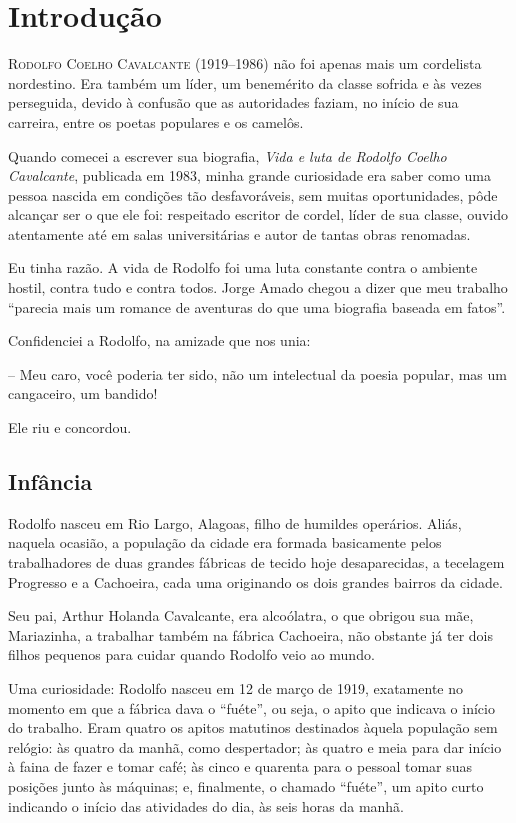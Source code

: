 \chapter[Introdução, por Eno T. Wanke]{Introdução}

\textsc{Rodolfo Coelho Cavalcante} (1919--1986) não foi apenas mais um
cordelista nordestino. Era também um líder, um benemérito da classe
sofrida e às vezes perseguida, devido à confusão que as autoridades
faziam, no início de sua carreira, entre os poetas populares e os
camelôs. 

 Quando comecei a escrever sua biografia, \textit{Vida e luta de Rodolfo
Coelho Cavalcante}, publicada em 1983, minha grande curiosidade era
saber como uma pessoa nascida em condições tão desfavoráveis, sem
muitas oportunidades, pôde alcançar ser o que ele foi: respeitado
escritor de cordel, líder de sua classe, ouvido atentamente até em
salas universitárias e autor de tantas obras renomadas. 

 Eu tinha razão. A vida de Rodolfo foi uma luta constante contra o
ambiente hostil, contra tudo e contra todos. Jorge Amado chegou a dizer
que meu trabalho ``parecia mais um romance de aventuras do
que uma biografia baseada em fatos''. 

 Confidenciei a Rodolfo, na amizade que nos unia: 

 -- Meu caro, você poderia ter sido, não um intelectual da poesia
popular, mas um cangaceiro, um bandido! 

 Ele riu e concordou. 

\section{Infância}

 Rodolfo nasceu em Rio Largo, Alagoas, filho de humildes operários.
Aliás, naquela ocasião, a população da cidade era formada basicamente
pelos trabalhadores de duas grandes fábricas de tecido hoje
desaparecidas, a tecelagem Progresso e a Cachoeira, cada uma originando
os dois grandes bairros da cidade. 

 Seu pai, Arthur Holanda Cavalcante, era alcoólatra, o que obrigou sua
mãe, Mariazinha, a trabalhar também na fábrica Cachoeira, não obstante
já ter dois filhos pequenos para cuidar quando Rodolfo veio ao mundo. 

 Uma curiosidade: Rodolfo nasceu em 12 de março de 1919, exatamente no
momento em que a fábrica dava o ``fuéte'', ou
seja, o apito que indicava o início do trabalho. Eram quatro os apitos
matutinos destinados àquela população sem relógio: às quatro da manhã,
como despertador; às quatro e meia para dar início à faina de fazer e
tomar café; às cinco e quarenta para o pessoal tomar suas posições
junto às máquinas; e, finalmente, o chamado
``fuéte'', um apito curto indicando o início
das atividades do dia, às seis horas da manhã. 

